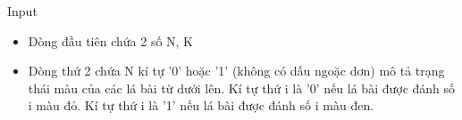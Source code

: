 Input  
\begin{itemize}
	\item     Dòng đầu tiên chứa 2 số N, K   
	\item     Dòng thứ 2 chứa N kí tự '0' hoặc '1' (không có dấu ngoặc dơn) mô tả trạng thái màu của các lá bài từ dưới lên. Kí tự thứ i là '0' nếu lá bài được đánh số i màu đỏ. Kí tự thứ i là '1' nếu lá bài được đánh số i màu đen.   
\end{itemize}